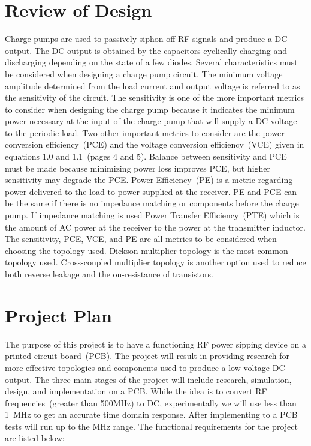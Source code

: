 \documentclass[12pt]{article}
\begin{document}
	\section{Review of Design}
	Charge pumps are used to passively siphon off RF signals and produce a DC output. The DC output is obtained by the capacitors cyclically charging and discharging depending on the state of a few diodes. Several characteristics must be considered when designing a charge pump circuit. The minimum voltage amplitude determined from the load current and output voltage is referred to as the sensitivity of the circuit. The sensitivity is one of the more important metrics to consider when designing the charge pump because it indicates the minimum power necessary at the input of the charge pump that will supply a DC voltage to the periodic load. Two other important metrics to consider are the power conversion efficiency~(PCE) and the voltage conversion efficiency~(VCE) given in equations 1.0 and 1.1~(pages 4 and 5). Balance between sensitivity and PCE must be made because minimizing power loss improves PCE, but higher sensitivity may degrade the PCE.  Power Efficiency~(PE) is a metric regarding power delivered to the load to power supplied at the receiver. PE and PCE can be the same if there is no impedance matching or components before the charge pump.  If impedance matching is used Power Transfer Efficiency~(PTE) which is the amount of AC power at the receiver to the power at the transmitter inductor. The sensitivity, PCE, VCE, and PE are all metrics to be considered when choosing the topology used. Dickson multiplier topology is the most common topology used. Cross-coupled multiplier topology is another option used to reduce both reverse leakage and the on-resistance of transistors.
	
	\section{Project Plan}
	The purpose of this project is to have a functioning RF power sipping device on a printed circuit board~(PCB). The project will result in providing research for more effective topologies and components used to produce a low voltage DC output. The three main stages of the project will include research, simulation, design, and implementation on a PCB. While the idea is to convert RF frequencies~(greater than 500MHz) to DC, experimentally we will use less than 1~MHz to get an accurate time domain response. After implementing to a PCB tests will run up to the MHz range. The functional requirements for the project are listed below:\\
	
\end{document}
